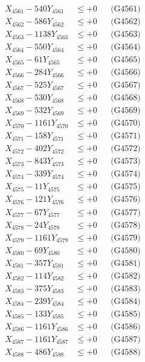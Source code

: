 \documentclass[a4paper,10pt]{article}
\begin{document}
{\begin{align}
\allowbreak
X_{4561} - 540Y_{4561} &\leq +0 && \text{(G4561)} \\
X_{4562} - 586Y_{4562} &\leq +0 && \text{(G4562)} \\
X_{4563} - 1138Y_{4563} &\leq +0 && \text{(G4563)} \\
X_{4564} - 550Y_{4564} &\leq +0 && \text{(G4564)} \\
X_{4565} - 61Y_{4565} &\leq +0 && \text{(G4565)} \\
X_{4566} - 284Y_{4566} &\leq +0 && \text{(G4566)} \\
X_{4567} - 525Y_{4567} &\leq +0 && \text{(G4567)} \\
X_{4568} - 530Y_{4568} &\leq +0 && \text{(G4568)} \\
X_{4569} - 532Y_{4569} &\leq +0 && \text{(G4569)} \\
X_{4570} - 1161Y_{4570} &\leq +0 && \text{(G4570)} \\
\allowbreak
X_{4571} - 158Y_{4571} &\leq +0 && \text{(G4571)} \\
X_{4572} - 402Y_{4572} &\leq +0 && \text{(G4572)} \\
X_{4573} - 843Y_{4573} &\leq +0 && \text{(G4573)} \\
X_{4574} - 339Y_{4574} &\leq +0 && \text{(G4574)} \\
X_{4575} - 11Y_{4575} &\leq +0 && \text{(G4575)} \\
X_{4576} - 121Y_{4576} &\leq +0 && \text{(G4576)} \\
X_{4577} - 67Y_{4577} &\leq +0 && \text{(G4577)} \\
X_{4578} - 24Y_{4578} &\leq +0 && \text{(G4578)} \\
X_{4579} - 1161Y_{4579} &\leq +0 && \text{(G4579)} \\
X_{4580} - 69Y_{4580} &\leq +0 && \text{(G4580)} \\
\allowbreak
X_{4581} - 357Y_{4581} &\leq +0 && \text{(G4581)} \\
X_{4582} - 114Y_{4582} &\leq +0 && \text{(G4582)} \\
X_{4583} - 375Y_{4583} &\leq +0 && \text{(G4583)} \\
X_{4584} - 239Y_{4584} &\leq +0 && \text{(G4584)} \\
X_{4585} - 133Y_{4585} &\leq +0 && \text{(G4585)} \\
X_{4586} - 1161Y_{4586} &\leq +0 && \text{(G4586)} \\
X_{4587} - 1161Y_{4587} &\leq +0 && \text{(G4587)} \\
X_{4588} - 486Y_{4588} &\leq +0 && \text{(G4588)} \\

\end{align}}
\end{document}
